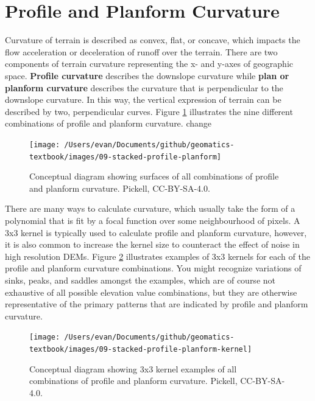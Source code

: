 \documentclass[
]{book}
\begin{document}
\hypertarget{profile-and-planform-curvature}{%
\section{Profile and Planform Curvature}\label{profile-and-planform-curvature}}

Curvature of terrain is described as convex, flat, or concave, which impacts the flow acceleration or deceleration of runoff over the terrain. There are two components of terrain curvature representing the x- and y-axes of geographic space. \textbf{Profile curvature} describes the downslope curvature while \textbf{plan or planform curvature} describes the curvature that is perpendicular to the downslope curvature. In this way, the vertical expression of terrain can be described by two, perpendicular curves. Figure \ref{fig:9-stacked-profile-planform} illustrates the nine different combinations of profile and planform curvature. change

\begin{figure}
\texttt{[image: /Users/evan/Documents/github/geomatics-textbook/images/09-stacked-profile-planform]} \caption{Conceptual diagram showing surfaces of all combinations of profile and planform curvature. Pickell, CC-BY-SA-4.0.}\label{fig:9-stacked-profile-planform}
\end{figure}

There are many ways to calculate curvature, which usually take the form of a polynomial that is fit by a focal function over some neighbourhood of pixels. A 3x3 kernel is typically used to calculate profile and planform curvature, however, it is also common to increase the kernel size to counteract the effect of noise in high resolution DEMs. Figure \ref{fig:9-stacked-profile-planform-kernel} illustrates examples of 3x3 kernels for each of the profile and planform curvature combinations. You might recognize variations of sinks, peaks, and saddles amongst the examples, which are of course not exhaustive of all possible elevation value combinations, but they are otherwise representative of the primary patterns that are indicated by profile and planform curvature.

\begin{figure}
\texttt{[image: /Users/evan/Documents/github/geomatics-textbook/images/09-stacked-profile-planform-kernel]} \caption{Conceptual diagram showing 3x3 kernel examples of all combinations of profile and planform curvature. Pickell, CC-BY-SA-4.0.}\label{fig:9-stacked-profile-planform-kernel}
\end{figure}
\end{document}
